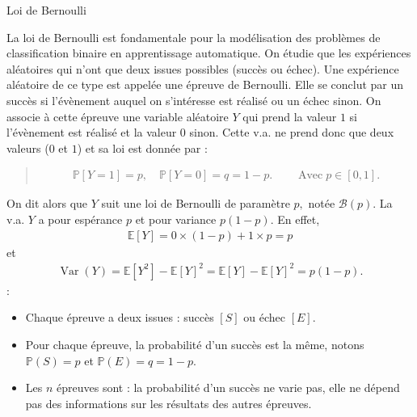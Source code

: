 \documentclass[letterpaper,11pt,english]{sphinxmanual}
\begin{document}
\begin{DUlineblock}{0em}
\item[]  Loi de Bernoulli
\item[] La loi de Bernoulli est fondamentale pour la modélisation des
problèmes de classification binaire en apprentissage automatique. On
étudie que les expériences aléatoires qui n’ont que deux issues
possibles (succès ou échec). Une expérience aléatoire de ce type est
appelée une épreuve de Bernoulli. Elle se conclut par un succès si
l’évènement auquel on s’intéresse est réalisé ou un échec sinon. On
associe à cette épreuve une variable aléatoire \(Y\) qui prend la
valeur \(1\) si l’évènement est réalisé et la valeur \(0\)
sinon. Cette v.a. ne prend donc que deux valeurs (\(0\) et
\(1\)) et sa loi est donnée par :
\end{DUlineblock}
\begin{quote}
\begin{equation}\label{equation:chapter2:chapter2:43}
\begin{split}\mathbb{P}[Y=1]=p, \quad \mathbb{P}[Y=0]=q=1-p.\qquad \operatorname{Avec } p \in [0, 1].\end{split}
\end{equation}\end{quote}

\sphinxAtStartPar
On dit alors que \(Y\) suit une loi de Bernoulli de paramètre
\(p,\) notée \(\mathcal{B}(p)\). La v.a. \(Y\) a pour
espérance \(p\) et pour variance \(p(1-p) .\) En effet,
\begin{equation}\label{equation:chapter2:chapter2:44}
\begin{split}\mathbb{E}[Y]=0 \times(1-p)+1 \times p=p\end{split}
\end{equation}
\sphinxAtStartPar
et
\begin{equation}\label{equation:chapter2:chapter2:45}
\begin{split}\operatorname{Var}(Y)=\mathbb{E}\left[Y^{2}\right]-\mathbb{E}[Y]^{2}=\mathbb{E}[Y]-\mathbb{E}[Y]^{2}=p(1-p).\end{split}
\end{equation}
\sphinxAtStartPar
{} :
\begin{itemize}
\item {} 
\sphinxAtStartPar
Chaque épreuve a deux issues : succès \([S]\) ou échec
\([E]\).

\item {} 
\sphinxAtStartPar
Pour chaque épreuve, la probabilité d’un succès est la même, notons
\(\mathbb{P}(S) = p\) et \(\mathbb{P}(E) = q = 1 - p.\)

\item {} 
\sphinxAtStartPar
Les \(n\) épreuves sont  : la probabilité d’un
succès ne varie pas, elle ne dépend pas des informations sur les
résultats des autres épreuves.

\end{itemize}
\end{document}
